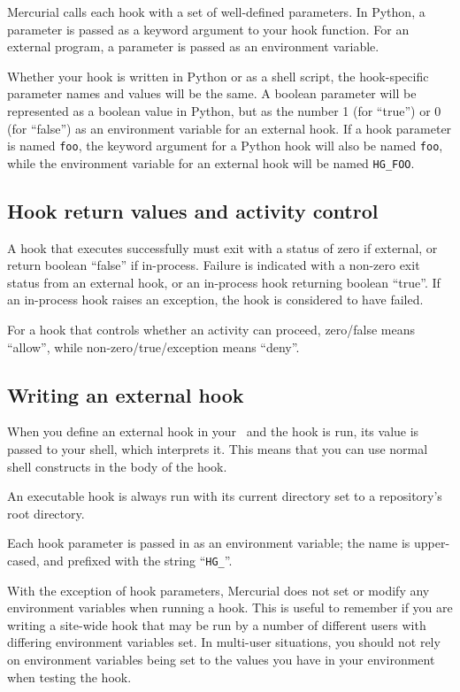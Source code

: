 Mercurial calls each hook with a set of well-defined parameters.  In
Python, a parameter is passed as a keyword argument to your hook
function.  For an external program, a parameter is passed as an
environment variable.

Whether your hook is written in Python or as a shell script, the
hook-specific parameter names and values will be the same.  A boolean
parameter will be represented as a boolean value in Python, but as the
number 1 (for ``true'') or 0 (for ``false'') as an environment
variable for an external hook.  If a hook parameter is named
\texttt{foo}, the keyword argument for a Python hook will also be
named \texttt{foo}, while the environment variable for an external
hook will be named \texttt{HG\_FOO}.

\subsection{Hook return values and activity control}

A hook that executes successfully must exit with a status of zero if
external, or return boolean ``false'' if in-process.  Failure is
indicated with a non-zero exit status from an external hook, or an
in-process hook returning boolean ``true''.  If an in-process hook
raises an exception, the hook is considered to have failed.

For a hook that controls whether an activity can proceed, zero/false
means ``allow'', while non-zero/true/exception means ``deny''.

\subsection{Writing an external hook}

When you define an external hook in your \hgrc\ and the hook is run,
its value is passed to your shell, which interprets it.  This means
that you can use normal shell constructs in the body of the hook.

An executable hook is always run with its current directory set to a
repository's root directory.

Each hook parameter is passed in as an environment variable; the name
is upper-cased, and prefixed with the string ``\texttt{HG\_}''.

With the exception of hook parameters, Mercurial does not set or
modify any environment variables when running a hook.  This is useful
to remember if you are writing a site-wide hook that may be run by a
number of different users with differing environment variables set.
In multi-user situations, you should not rely on environment variables
being set to the values you have in your environment when testing the
hook.


